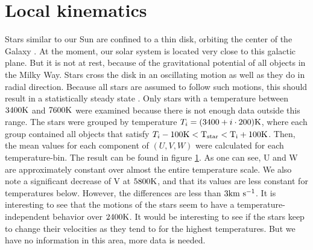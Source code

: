 \documentclass{aastex62}
\begin{document}
	\section{Local kinematics} \label{localkin}
	\noindent
	Stars similar to our Sun are confined to a thin disk, orbiting the center of the Galaxy \citep{keel}. At the moment, our solar system is located very close to this galactic plane. But it is not at rest, because of the gravitational potential of all objects in the Milky Way. Stars cross the disk in an oscillating motion as well as they do in radial direction. Because all stars are assumed to follow such motions, this should result in a statistically steady state \citep{tayler}. Only stars with a temperature between $3400\rm K$ and $7600\rm K$ were examined because there is not enough data outside this range. The stars were grouped by temperature $T_i=(3400+i\cdot200)\rm K$, where each group contained all objects that satisfy $T_i-100\rm K<T_{star}<T_i+100\rm K$. Then, the mean values for each component of $\left( U, V, W\right)$ were calculated for each temperature-bin. The result can be found in figure \ref{fig:lsrmean}. As one can see, U and W are approximately constant over almost the entire temperature scale. We also note a significant decrease of V at $5800\rm K$, and that its values are less constant for temperatures below. However, the differences are less than $3\rm km~s^{-1}$. It is interesting to see that the motions of the stars seem to have a temperature-independent behavior over $2400\rm K$. It would be interesting to see if the stars keep to change their velocities as they tend to for the highest temperatures. But we have no information in this area, more data is needed.


	\begin{figure}[ht!]
	\label{fig:lsrmean}
	\end{figure}
\end{document}
